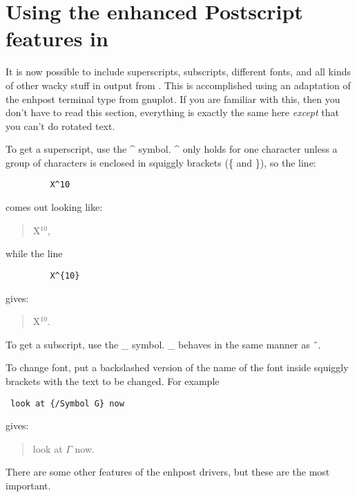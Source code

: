 \chapter{Using the enhanced Postscript features in \viewprog}

It is now possible to include superscripts, subscripts, different
fonts, and all kinds of other wacky stuff in output from \viewprog.
This is accomplished using an adaptation of the enhpost terminal type
from gnuplot.  If you are familiar with this, then you don't have to
read this section, everything is exactly the same here {\em except}
that you can't do rotated text.

To get a superscript, use the \^{} symbol.  \^{} only holds for one
character unless a group of characters is enclosed in squiggly
brackets (\{ and \}), so the line:
\begin{verbatim}         X^10 \end{verbatim}
comes out looking like: 
\begin{quotation}
X$^10$,
\end{quotation}
while the line 
\begin{verbatim}         X^{10} \end{verbatim} 
gives:
\begin{quotation}
X$^{10}$. 
\end{quotation}
To get a subscript, use the \_ symbol.  \_ behaves in the same manner
as \^\ . 

To change font, put a backslashed version of the name of the font
inside squiggly brackets with the text to be changed.  For example
\begin{verbatim} look at {/Symbol G} now \end{verbatim}  
gives: 
\begin{quotation}
look at $\Gamma$ now. 
\end{quotation}

There are some other features of the enhpost drivers, but these are
the most important.
